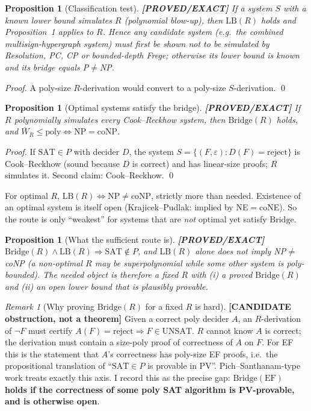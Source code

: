 \documentclass[11pt]{article}
\newtheorem{proposition}[theorem]{Proposition}
\theoremstyle{remark}
\newtheorem*{remark}{Remark}
\newcommand{\SAT}{\mathrm{SAT}}
\newcommand{\UNSAT}{\mathrm{UNSAT}}
\newcommand{\Bridge}{\mathrm{Bridge}}
\newcommand{\status}[1]{\textbf{[#1]}}
\begin{document}
\begin{proposition}[Classification test]\status{PROVED/EXACT}
If a system $S$ with a known lower bound simulates $R$ (polynomial blow-up), then $\mathrm{LB}(R)$ holds and
Proposition~1 applies to $R$. Hence any candidate system (e.g.\ the combined multisign-hypergraph system) must first be
shown \emph{not} to be simulated by Resolution, PC, CP or bounded-depth Frege; otherwise its lower bound is known and its bridge equals P$\ne$NP.
\end{proposition}
\begin{proof}A poly-size $R$-derivation would convert to a poly-size $S$-derivation. \qed\end{proof}

\begin{proposition}[Optimal systems satisfy the bridge]\status{PROVED/EXACT}
If $R$ polynomially simulates every Cook--Reckhow system, then $\Bridge(R)$ holds, and $\overline W_R\le\mathrm{poly}\iff \mathrm{NP}=\mathrm{coNP}$.
\end{proposition}
\begin{proof}If $\SAT\in P$ with decider $D$, the system $S=\{(F,\varepsilon): D(F)=\text{reject}\}$ is Cook--Reckhow
(sound because $D$ is correct) and has linear-size proofs; $R$ simulates it. Second claim: Cook--Reckhow. \qed\end{proof}
\noindent For optimal $R$, $\mathrm{LB}(R)\iff \mathrm{NP}\ne\mathrm{coNP}$, strictly more than needed. Existence of an optimal system
is itself open (Krajicek--Pudlak: implied by NE$=$coNE). So the route is only ``weakest'' for systems that are
\emph{not} optimal yet satisfy $\Bridge$.

\begin{proposition}[What the sufficient route is]\status{PROVED/EXACT}
$\Bridge(R)\wedge \mathrm{LB}(R)\Rightarrow \SAT\notin P$, and $\mathrm{LB}(R)$ alone does \emph{not} imply NP$\neq$coNP (a non-optimal $R$ may be super\-polynomial while some other system is poly-bounded).
The needed object is therefore a fixed $R$ with (i) a proved $\Bridge(R)$ and (ii) an open lower bound that is plausibly provable.
\end{proposition}

\begin{remark}[Why proving $\Bridge(R)$ for a fixed $R$ is hard]\status{CANDIDATE obstruction, not a theorem}
Given a correct poly decider $A$, an $R$-derivation of $\neg F$ must certify $A(F)=\text{reject}\Rightarrow F\in\UNSAT$.
$R$ cannot know $A$ is correct; the derivation must contain a size-poly proof of correctness of $A$ on $F$. For EF this is
the statement that $A$'s correctness has poly-size EF proofs, i.e.\ the propositional translation of ``$\SAT\in P$ is provable in PV''.
Pich--Santhanam-type work treats exactly this axis. I record this as the precise gap: \textbf{$\Bridge(\mathrm{EF})$ holds if the correctness of some poly SAT algorithm is PV-provable, and is otherwise open}.
\end{remark}
\end{document}
